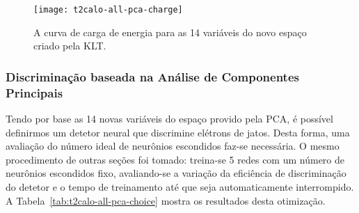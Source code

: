 \begin{figure}
\begin{center}
\texttt{[image: t2calo-all-pca-charge]}
\end{center}
\caption{A curva de carga de energia para as 14 variáveis do novo espaço
criado pela KLT.}
\label{fig:pca-charge}
\end{figure}

\subsubsection{Discriminação baseada na Análise de Componentes Principais}

Tendo por base as 14 novas variáveis do espaço provido pela PCA, é possível
definirmos um detetor neural que discrimine elétrons de jatos. Desta forma,
uma avaliação do número ideal de neurônios escondidos faz-se necessária. O
mesmo procedimento de outras seções foi tomado: treina-se 5 redes com um
número de neurônios escondidos fixo, avaliando-se a variação da eficiência de
discriminação do detetor e o tempo de treinamento até que seja automaticamente
interrompido. A Tabela~\ref{tab:t2calo-all-pca-choice} mostra os resultados
desta otimização.

